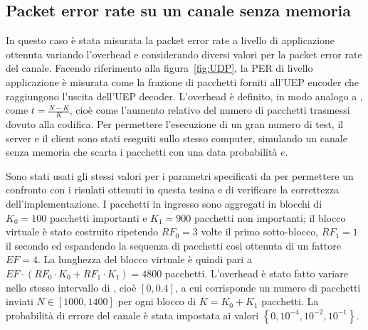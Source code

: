 \documentclass[italian, a4paper, 12pt]{article}
\begin{document}
\subsection{Packet error rate su un canale senza memoria}
In questo caso è stata misurata la packet error rate a livello di
applicazione ottenuta variando l'overhead e considerando diversi
valori per la packet error rate del canale.
%
Facendo riferimento alla figura~\ref{fig:UDP}, la PER di livello
applicazione è misurata come la frazione di pacchetti forniti all'UEP
encoder che raggiungono l'uscita dell'UEP decoder.
%
L'overhead è definito, in modo analogo a \cite{uep}, come $t =
\frac{N-K}{K}$, cioè come l'aumento relativo del numero di pacchetti
trasmessi dovuto alla codifica.
%
Per permettere l'esecuzione di un gran numero di test, il server e il
client sono stati eseguiti sullo stesso computer, simulando un canale
senza memoria che scarta i pacchetti con una data probabilità $e$.

Sono stati usati gli stessi valori per i parametri specificati da
\cite{uep} per permettere un confronto con i risulati ottenuti in
questa tesina e di verificare la correttezza dell'implementazione.
%
I pacchetti in ingresso sono aggregati in blocchi di $K_0 = 100$
pacchetti importanti e $K_1 = 900$ pacchetti non importanti; il blocco
virtuale è stato costruito ripetendo $RF_0 = 3$ volte il primo
sotto-blocco, $RF_1 = 1$ il secondo ed espandendo la sequenza di
pacchetti così ottenuta di un fattore $EF = 4$. La lunghezza del
blocco virtuale è quindi pari a $EF \cdot \left( RF_0 \cdot K_0 + RF_1
\cdot K_1 \right) = 4800$ pacchetti.
%
L'overhead è stato fatto variare nello stesso intervallo di
\cite{uep}, cioè $[0, 0.4]$, a cui corrisponde un numero di pacchetti
inviati $N \in [1000, 1400]$ per ogni blocco di $K=K_0+K_1$ pacchetti.
%
La probabilità di errore del canale è stata impostata ai valori $\left\{ 0,
10^{-4}, 10^{-2},10^{-1} \right\}$.
\end{document}
